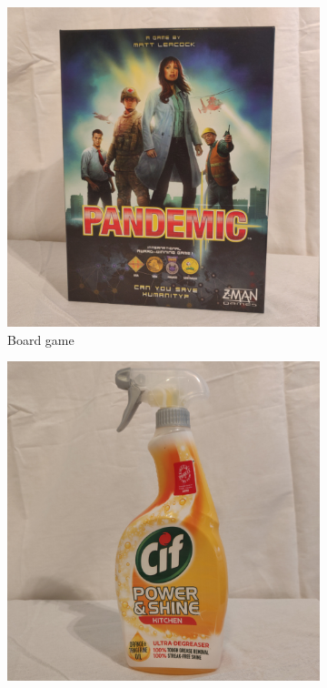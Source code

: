 \documentclass{l4proj}
\begin{document}
\begin{figure}[H]
    \centering %
\begin{subfigure}{0.20\textwidth}
  \includegraphics[width=\linewidth]{l4template-master/images/board_game.png}
  \caption{Board game}
  \label{boardgame}
\end{subfigure}\hfil %
\begin{subfigure}{0.20\textwidth}
  \includegraphics[width=\linewidth]{l4template-master/images/cif.png}

\end{subfigure}
\end{figure}
\end{document}
